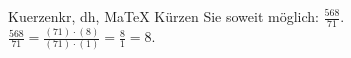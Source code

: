 \begin{MAufgabe}{Kuerzen}{kr, dh, MaTeX}
K\"urzen Sie soweit m\"oglich: $\frac{568}{71}$.\\ 
\ifLsg\MLoesung
\quad $\frac{568}{71}=\frac{(71)\cdot(8)}{(71)\cdot(1)}=\frac{8}{1}=8$.\else\relax\fi
 \end{MAufgabe}